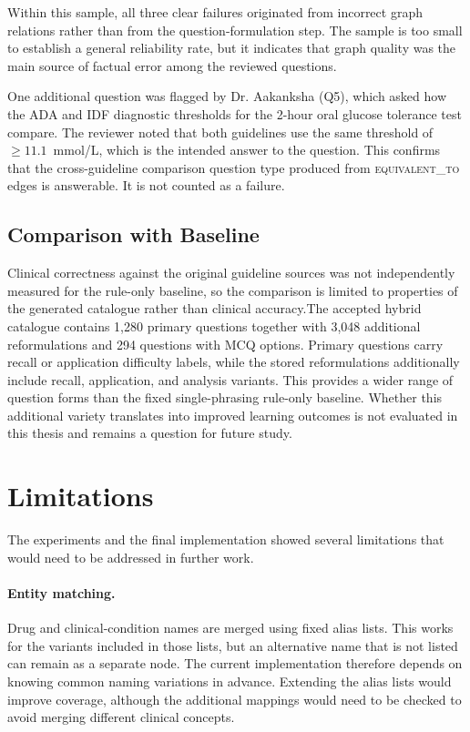 Within this sample, all three clear failures originated from incorrect
graph relations rather than from the question-formulation step. The
sample is too small to establish a general reliability rate, but it
indicates that graph quality was the main source of factual error among
the reviewed questions.

One additional question was flagged by Dr. Aakanksha (Q5), which asked how the ADA
and IDF diagnostic thresholds for the 2-hour oral glucose tolerance test
compare. The reviewer noted that both guidelines use the same
threshold of $\geq 11.1$~mmol/L, which is the intended answer to the
question. This confirms that the cross-guideline comparison question type
produced from \textsc{equivalent\_to} edges is answerable. It is not counted as a failure.



\subsection{Comparison with Baseline}
\label{sec:exp_quality-comparison}

Clinical correctness against the original guideline sources was not independently measured for the rule-only baseline, so the comparison is limited to properties of the generated catalogue rather than clinical accuracy.The accepted hybrid catalogue contains 1,280 primary questions together with 3,048 additional reformulations and 294 questions with MCQ options. Primary questions carry recall or application difficulty labels, while the stored reformulations additionally include recall, application, and analysis variants. This provides a wider range of question forms than the fixed single-phrasing rule-only baseline. Whether this additional variety translates into improved learning outcomes is not evaluated in this thesis and remains a question for future study.



\section{Limitations}
\label{sec:exp_limitations}

The experiments and the final implementation showed several limitations
that would need to be addressed in further work.

\paragraph{Entity matching.}
Drug and clinical-condition names are merged using fixed alias lists.
This works for the variants included in those lists, but an alternative
name that is not listed can remain as a separate node. The current
implementation therefore depends on knowing common naming variations in
advance. Extending the alias lists would improve coverage, although the
additional mappings would need to be checked to avoid merging different
clinical concepts.

